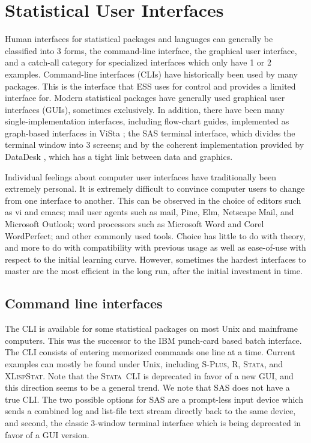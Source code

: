 \documentclass{article}
\newcommand*{\Splus}{\textsc{S-Plus}}
\newcommand*{\XLispStat}{\textsc{XLispStat}}
\newcommand*{\Stata}{\textsc{Stata}}
\begin{document}
\section{Statistical User Interfaces}
\label{sec:UI}

Human interfaces for statistical packages and languages can generally
be classified into 3 forms, the command-line interface, the graphical
user interface, and a catch-all category for specialized interfaces
which only have 1 or 2 examples.  Command-line interfaces (CLIs) have
historically been used by many packages.  This is the interface that
ESS uses for control and provides a limited interface for.  Modern
statistical packages have generally used graphical user interfaces
(GUIs), sometimes exclusively.  In addition, there have been many
single-implementation interfaces, including flow-chart guides,
implemented as graph-based interfaces in ViSta \citep{youn:lubi:1995};
the SAS terminal interface, which divides the terminal window into 3
screens; and by the coherent implementation provided by DataDesk
\citep{vell:prat:1989}, which has a tight link between data and
graphics.

Individual feelings about computer user interfaces have traditionally
been extremely personal.  It is extremely difficult to convince
computer users to change from one interface to another.  This can be
observed in the choice of editors such as vi and emacs; mail user agents
such as mail, Pine, Elm, Netscape Mail, and Microsoft Outlook; word
processors such as Microsoft Word and Corel WordPerfect; and other
commonly used tools.  Choice has little to do with theory, and more to
do with compatibility with previous usage as well as ease-of-use with
respect to the initial learning curve.  However, sometimes the hardest
interfaces to master are the most efficient in the long run, after the
initial investment in time.

\subsection{Command line interfaces}
\label{sec:UI:command}

The CLI is available for some statistical packages on most Unix and
mainframe computers.  This was the successor to the IBM punch-card
based batch interface.  The CLI consists of entering memorized
commands one line at a time.  Current examples can mostly be found
under Unix, including \Splus, R, \Stata, and \XLispStat.  Note that
the \Stata\ CLI is deprecated in favor of a new GUI, and this
direction seems to be a general trend.  We note that SAS does not have
a true CLI.  The two possible options for SAS are a prompt-less input
device which sends a combined log and list-file text stream directly
back to the same device, and second, the classic 3-window %
terminal interface which is being deprecated in favor of a GUI
version.
\end{document}
